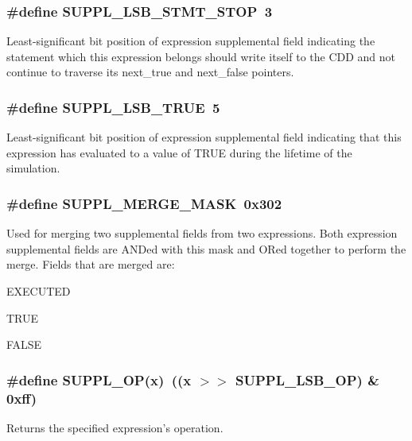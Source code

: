 \subsubsection{\setlength{\rightskip}{0pt plus 5cm}\#define SUPPL\_\-LSB\_\-STMT\_\-STOP\ 3}\label{group__expr__suppl_a3}


Least-significant bit position of expression supplemental field indicating the statement which this expression belongs should write itself to the CDD and not continue to traverse its next\_\-true and next\_\-false pointers. 
\subsubsection{\setlength{\rightskip}{0pt plus 5cm}\#define SUPPL\_\-LSB\_\-TRUE\ 5}\label{group__expr__suppl_a5}


Least-significant bit position of expression supplemental field indicating that this expression has evaluated to a value of TRUE during the lifetime of the simulation. 
\subsubsection{\setlength{\rightskip}{0pt plus 5cm}\#define SUPPL\_\-MERGE\_\-MASK\ 0x302}\label{group__expr__suppl_a10}


Used for merging two supplemental fields from two expressions. Both expression supplemental fields are ANDed with this mask and ORed together to perform the merge. Fields that are merged are:\begin{CompactItemize}
\item 
EXECUTED\item 
TRUE\item 
FALSE \end{CompactItemize}
\subsubsection{\setlength{\rightskip}{0pt plus 5cm}\#define SUPPL\_\-OP(x)\ ((x $>$$>$ SUPPL\_\-LSB\_\-OP) \& 0xff)}\label{group__expr__suppl_a18}


Returns the specified expression's operation. 
